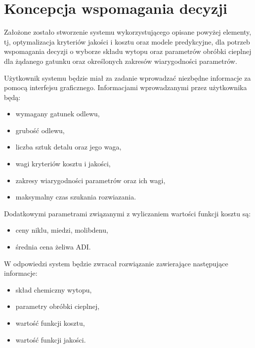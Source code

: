 \section{Koncepcja wspomagania decyzji}\label{sec:dec-sup-sys-concept}
Założone zostało stworzenie systemu wykorzystującego opisane powyżej elementy, tj, optymalizacja kryteriów jakości i kosztu oraz modele predykcyjne, dla potrzeb wspomagania decyzji o wyborze składu wytopu oraz parametrów obróbki cieplnej dla żądanego gatunku oraz określonych zakresów wiarygodności parametrów. 

Użytkownik systemu będzie miał za zadanie wprowadzać niezbędne informacje za pomocą interfejsu graficznego. Informacjami wprowadzanymi przez użytkownika będą:
\begin{itemize}
    \item wymagany gatunek odlewu,
    \item grubość odlewu,
    \item liczba sztuk detalu oraz jego waga,
    \item wagi kryteriów kosztu i jakości,
    \item zakresy wiarygodności parametrów oraz ich wagi,
    \item maksymalny czas szukania rozwiazania.
\end{itemize}
Dodatkowymi parametrami związanymi z wyliczaniem wartości funkcji kosztu są:
\begin{itemize}
    \item ceny niklu, miedzi, molibdenu,
    \item średnia cena żeliwa ADI.
\end{itemize}
W odpowiedzi system będzie zwracał rozwiązanie zawierające następujące informacje:
\begin{itemize}
    \item skład chemiczny wytopu,
    \item parametry obróbki cieplnej,
    \item wartość funkcji kosztu,
    \item wartość funkcji jakości.
\end{itemize}

